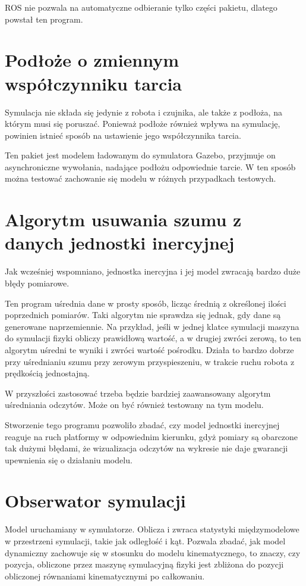 	ROS nie pozwala na automatyczne odbieranie tylko części pakietu, dlatego powstał ten program.

\section{Podłoże o zmiennym współczynniku tarcia}
	\label{sec:flooria}
	Symulacja nie składa się jedynie z robota i czujnika, ale także z podłoża, na którym musi się poruszać.
	Ponieważ podłoże również wpływa na symulację, powinien istnieć sposób na ustawienie jego współczynnika tarcia.
	
	Ten pakiet jest modelem ładowanym do symulatora Gazebo, przyjmuje on asynchroniczne wywołania, nadające podłożu odpowiednie tarcie.
	W ten sposób można testować zachowanie się modelu w różnych przypadkach testowych.
	
\section{Algorytm usuwania szumu z danych jednostki inercyjnej}
	\label{sec:odszumiacz}
	Jak wcześniej wspomniano, jednostka inercyjna i jej model zwracają bardzo duże błędy pomiarowe.
	
	Ten program uśrednia dane w prosty sposób, licząc średnią z określonej ilości poprzednich pomiarów.
	Taki algorytm nie sprawdza się jednak, gdy dane są generowane naprzemiennie.
	Na przykład, jeśli w jednej klatce symulacji maszyna do symulacji fizyki obliczy prawidłową wartość, a w drugiej zwróci zerową,
	to ten algorytm uśredni te wyniki i zwróci wartość pośrodku. Działa to bardzo dobrze przy uśrednianiu 
	szumu przy zerowym przyspieszeniu, w trakcie ruchu robota z prędkością jednostajną.
	
	W przyszłości zastosować trzeba będzie bardziej zaawansowany algorytm uśredniania odczytów.
	Może on być również testowany na tym modelu.
	
	Stworzenie tego programu pozwoliło zbadać, czy model jednostki inercyjnej reaguje na ruch platformy w odpowiednim kierunku, gdyż
	pomiary są obarczone tak dużymi błędami, że wizualizacja odczytów na wykresie nie daje gwarancji upewnienia się o działaniu modelu.
	
\section{Obserwator symulacji}
	\label{sec:ocznica}
	Model uruchamiany w symulatorze.
	Oblicza i zwraca statystyki międzymodelowe w przestrzeni symulacji, takie jak odległość i kąt.
	Pozwala zbadać, jak model dynamiczny zachowuje się w stosunku do modelu kinematycznego, to znaczy, 
	czy pozycja, obliczone przez maszynę symulacyjną fizyki jest zbliżona do pozycji obliczonej równaniami kinematycznymi po całkowaniu.
	

